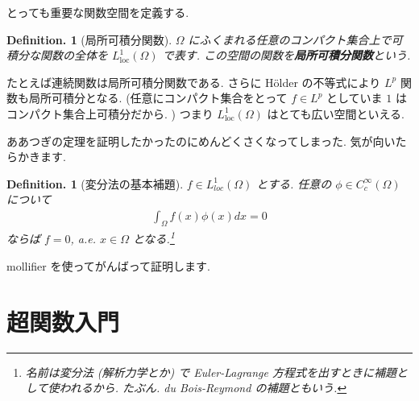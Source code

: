 \documentclass[openany, a4paper, oneside]{book}
\theoremstyle{break}
\theoremstyle{breakdefn}
\newtheorem{defn}[thm]{Definition.}
\newcommand{\Loneloc}{L_{\mathrm{loc}}^1}
\begin{document}
とっても重要な関数空間を定義する.
\begin{defn}[局所可積分関数]
 $\Omega$ にふくまれる任意のコンパクト集合上で可積分な関数の全体を $\Loneloc (\Omega)$ で表す.
 この空間の関数を\textbf{局所可積分関数}という.
\end{defn}

たとえば連続関数は局所可積分関数である.
さらに H\"older の不等式により $L^p$ 関数も局所可積分となる.
(任意にコンパクト集合をとって $f\in L^p$ としていま $1$ はコンパクト集合上可積分だから. )
つまり $\Loneloc (\Omega)$ はとても広い空間といえる.

ああつぎの定理を証明したかったのにめんどくさくなってしまった.
気が向いたらかきます.

\begin{defn}[変分法の基本補題]
 $f\in L_{loc}^1 (\Omega)$ とする.
 任意の $\phi \in C_c^{\infty}(\Omega)$ について
 \begin{align}
  \int_{\Omega}f (x)\phi (x) dx = 0
 \end{align}
 ならば $f = 0$, a.e. $x \in \Omega$ となる.\footnote{名前は変分法 (解析力学とか) で Euler-Lagrange 方程式を出すときに補題として使われるから.
たぶん.
du Bois-Reymond の補題ともいう.
 }
\end{defn}

mollifier を使ってがんばって証明します.
\section{超関数入門}
\label{sec-7-12-4}
\end{document}
